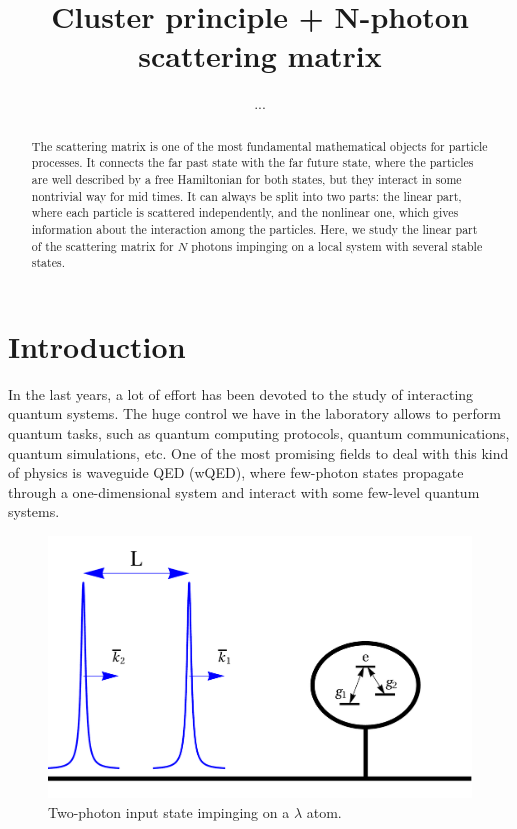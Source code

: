 \documentclass[aps,pra,reprint,amsmath,amssymb]{revtex4-1}
\begin{document}
\title{Cluster principle + N-photon scattering matrix}

\author{...}


\begin{abstract}
The scattering matrix is one of the most fundamental mathematical objects for particle processes. It connects the far past state with the far future state, where the particles are well described by a free Hamiltonian for both states, but they interact in some nontrivial way for mid times. It can always be split into two parts: the linear part, where each particle is scattered independently, and the nonlinear one, which gives information about the interaction among the particles. Here, we study the linear part of the scattering matrix for $N$ photons impinging on a local system with several stable states. 
\end{abstract}



\maketitle


\section{Introduction}

In the last years, a lot of effort has been devoted to the study of interacting quantum systems. The huge control we have in the laboratory allows to perform quantum tasks, such as quantum computing protocols, quantum communications, quantum simulations, etc. One of the most promising fields to deal with this kind of physics is waveguide QED (wQED), where few-photon states propagate through a one-dimensional system and interact with some few-level quantum systems. \cite{fan10,Xu2015,Xu2016,Sanchez-Burillo2015,Sanchez-Burillo2016}

\begin{figure}
\includegraphics[scale=0.25]{input.pdf}
\caption{Two-photon input state impinging on a $\lambda$ atom.}
\end{figure}
\end{document}
